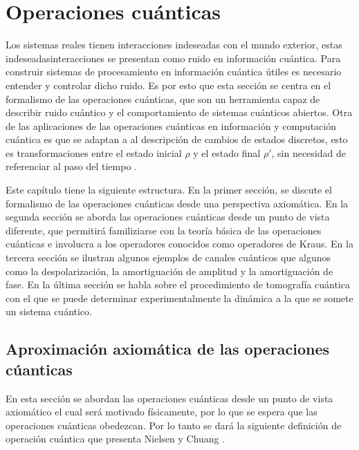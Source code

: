 \chapter{Operaciones cuánticas}


Los sistemas reales tienen interacciones indeseadas con el mundo exterior, estas indeseadasinteracciones se presentan como ruido en información cuántica. Para construir sistemas de procesamiento en información cuántica útiles es necesario entender y controlar dicho ruido. Es por esto que esta sección se centra en el formalismo de las operaciones cuánticas, que son un herramienta capaz de describir ruido cuántico y el comportamiento de sistemas cuánticos abiertos. Otra de las aplicaciones de las operaciones cuánticas en información y computación cuántica  es que se adaptan a al descripción de cambios de estados discretos, esto es transformaciones entre el estado inicial $\rho$ y el estado final $\rho'$, sin necesidad de referenciar al paso del tiempo {\cite{nielsen_chuang_2010}}.


Este capítulo tiene la siguiente estructura. En la primer sección, se discute el formalismo de las operaciones cuánticas desde una perspectiva axiomática. En la segunda sección se aborda las operaciones cuánticas desde un punto de vista diferente, que permitirá familiziarse con la teoría básica de las operaciones cuánticas e involucra a los operadores conocidos como operadores de Kraus. En la tercera sección se ilustran algunos ejemplos de canales cuánticos que algunos como la despolarización, la amortiguación de amplitud y la amortiguación de fase. En la última sección se habla sobre el procedimiento de tomografía cuántica con el que se puede determinar experimentalmente la dinámica a la que se somete un sistema cuántico.

\section{Aproximación axiomática de las operaciones cúanticas}
En esta sección se abordan las operaciones cuánticas desde un punto de vista axiomático el cual será motivado físicamente, por lo que se espera que las operaciones cuánticas obedezcan. Por lo tanto se dará la siguiente definición de operación cuántica que presenta Nielsen y Chuang {\cite{nielsen_chuang_2010}}.



